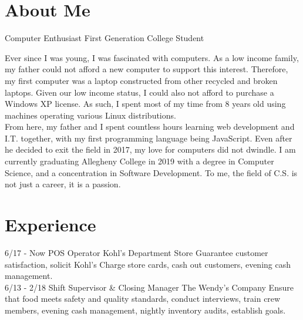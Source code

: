 \documentclass[]{friggeri-cv}
\begin{document}
\section{About Me}
\begin{entrylist}
	\entry
	{}
	{Computer Enthusiast}
	{First Generation College Student}
	{Ever since I was young, I was fascinated with computers. As a low income family, my father could not afford a new computer to support this interest.  Therefore, my first computer was a laptop constructed from other recycled and broken laptops.  Given our low income status, I could also not afford to purchase a Windows XP license. As such, I spent most of my time from 8 years old using machines operating various Linux distributions.\\
	
	From here, my father and I spent countless hours learning web development and I.T. together, with my first programming language being JavaScript.  Even after he decided to exit the field in 2017, my love for computers did not dwindle.  I am currently graduating Allegheny College in 2019 with a degree in Computer Science, and a concentration in Software Development.  To me, the field of C.S. is not just a career, it is a passion.

}
\end{entrylist}

\section{Experience}
\begin{entrylist}
  \entry
    {6/17 - Now}
    {POS Operator}
    {Kohl's Department Store}
    {Guarantee customer satisfaction, solicit Kohl's Charge store cards, cash out customers, evening cash management.\\}
  \entry
    {6/13 - 2/18}
    {Shift Supervisor \& Closing Manager}
    {The Wendy's Company}
    {Ensure that food meets safety and quality standards, conduct interviews, train crew members, evening cash management, nightly inventory audits, establish goals.\\}
\end{entrylist}
\end{document}
